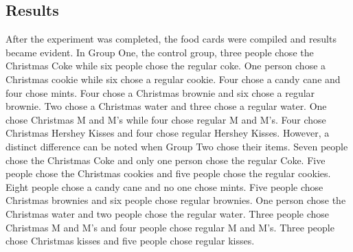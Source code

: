 \documentclass[twoside]{article}
\begin{document}
\begin{multicols}{2}
\section{Results}
After the experiment was completed, the food cards were compiled and results became evident. In Group One, the control group, three people chose the Christmas Coke while six people chose the regular coke. One person chose a Christmas cookie while six chose a regular cookie. Four chose a candy cane and four chose mints. Four chose a Christmas brownie and six chose a regular brownie. Two chose a Christmas water and three chose a regular water. One chose Christmas M and M's while four chose regular M and M's. Four chose Christmas Hershey Kisses and four chose regular Hershey Kisses. However, a distinct difference can be noted when Group Two chose their items. Seven people chose the Christmas Coke and only one person chose the regular Coke. Five people chose the Christmas cookies and five people chose the regular cookies. Eight people chose a candy cane and no one chose mints. Five people chose Christmas brownies and six people chose regular brownies. One person chose the Christmas water and two people chose the regular water. Three people chose Christmas M and M's and four people chose regular M and M's. Three people chose Christmas kisses and five people chose regular kisses.\\ \\ \\ \\ \\ \\ \\ \\ \\ \\ \\
\\ \\ \\ \\ \\ \\ \\ \\ \\ \\ \\ \\ \\ \\ \\ 
\\ \\ \\ \\ \\ \\ \\ \\ \\ \\ \\ \\ \\ \\ \\ \\ \\

\end{multicols}
\end{document}
